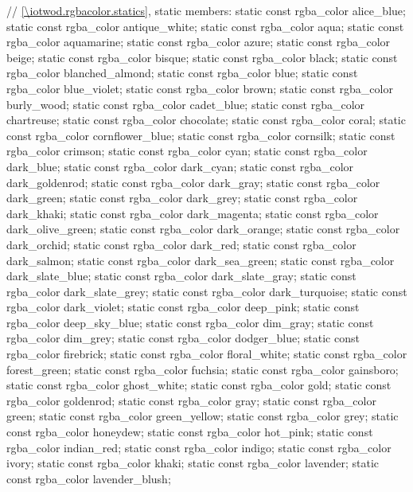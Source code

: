 \begin{codeblock}
{{    // \ref{\iotwod.rgbacolor.statics}, static members:
    static const rgba_color alice_blue;
    static const rgba_color antique_white;
    static const rgba_color aqua;
    static const rgba_color aquamarine;
    static const rgba_color azure;
    static const rgba_color beige;
    static const rgba_color bisque;
    static const rgba_color black;
    static const rgba_color blanched_almond;
    static const rgba_color blue;
    static const rgba_color blue_violet;
    static const rgba_color brown;
    static const rgba_color burly_wood;
    static const rgba_color cadet_blue;
    static const rgba_color chartreuse;
    static const rgba_color chocolate;
    static const rgba_color coral;
    static const rgba_color cornflower_blue;
    static const rgba_color cornsilk;
    static const rgba_color crimson;
    static const rgba_color cyan;
    static const rgba_color dark_blue;
    static const rgba_color dark_cyan;
    static const rgba_color dark_goldenrod;
    static const rgba_color dark_gray;
    static const rgba_color dark_green;
    static const rgba_color dark_grey;
    static const rgba_color dark_khaki;
    static const rgba_color dark_magenta;
    static const rgba_color dark_olive_green;
    static const rgba_color dark_orange;
    static const rgba_color dark_orchid;
    static const rgba_color dark_red;
    static const rgba_color dark_salmon;
    static const rgba_color dark_sea_green;
    static const rgba_color dark_slate_blue;
    static const rgba_color dark_slate_gray;
    static const rgba_color dark_slate_grey;
    static const rgba_color dark_turquoise;
    static const rgba_color dark_violet;
    static const rgba_color deep_pink;
    static const rgba_color deep_sky_blue;
    static const rgba_color dim_gray;
    static const rgba_color dim_grey;
    static const rgba_color dodger_blue;
    static const rgba_color firebrick;
    static const rgba_color floral_white;
    static const rgba_color forest_green;
    static const rgba_color fuchsia;
    static const rgba_color gainsboro;
    static const rgba_color ghost_white;
    static const rgba_color gold;
    static const rgba_color goldenrod;
    static const rgba_color gray;
    static const rgba_color green;
    static const rgba_color green_yellow;
    static const rgba_color grey;
    static const rgba_color honeydew;
    static const rgba_color hot_pink;
    static const rgba_color indian_red;
    static const rgba_color indigo;
    static const rgba_color ivory;
    static const rgba_color khaki;
    static const rgba_color lavender;
    static const rgba_color lavender_blush;
}}
\end{codeblock}
